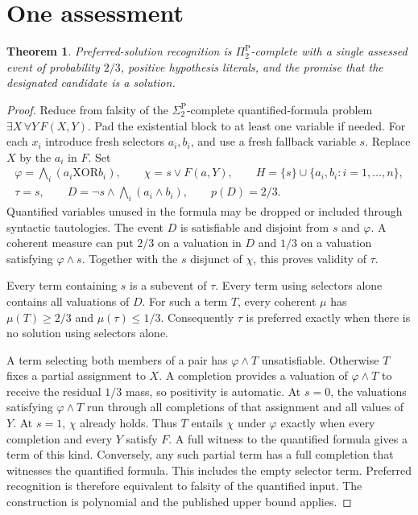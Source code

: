 \documentclass[11pt,a4paper]{amsart}
\newtheorem{theorem}{Theorem}
\begin{document}
\section{One assessment}
\begin{theorem}
Preferred-solution recognition is $\Pi_2^{\mathrm P}$-complete with a single assessed event of probability $2/3$, positive hypothesis literals, and the promise that the designated candidate is a solution.
\end{theorem}
\begin{proof}
Reduce from falsity of the $\Sigma_2^{\mathrm P}$-complete quantified-formula problem $\exists X\,\forall Y\,F(X,Y)$. Pad the existential block to at least one variable if needed. For each $x_i$ introduce fresh selectors $a_i,b_i$, and use a fresh fallback variable $s$. Replace $X$ by the $a_i$ in $F$. Set
\[
\begin{gathered}
\varphi=\bigwedge_i(a_i\mathbin{\mathrm{XOR}}b_i),\qquad
\chi=s\lor F(a,Y),\qquad H=\{s\}\cup\{a_i,b_i:i=1,\ldots,n\},\\
\tau=s,\qquad D=\neg s\land\bigwedge_i(a_i\land b_i),\qquad p(D)=2/3.
\end{gathered}
\]
Quantified variables unused in the formula may be dropped or included through syntactic tautologies. The event $D$ is satisfiable and disjoint from $s$ and $\varphi$. A coherent measure can put $2/3$ on a valuation in $D$ and $1/3$ on a valuation satisfying $\varphi\land s$. Together with the $s$ disjunct of $\chi$, this proves validity of $\tau$.

Every term containing $s$ is a subevent of $\tau$. Every term using selectors alone contains all valuations of $D$. For such a term $T$, every coherent $\mu$ has $\mu(T)\geq 2/3$ and $\mu(\tau)\leq1/3$. Consequently $\tau$ is preferred exactly when there is no solution using selectors alone.

A term selecting both members of a pair has $\varphi\land T$ unsatisfiable. Otherwise $T$ fixes a partial assignment to $X$. A completion provides a valuation of $\varphi\land T$ to receive the residual $1/3$ mass, so positivity is automatic. At $s=0$, the valuations satisfying $\varphi\land T$ run through all completions of that assignment and all values of $Y$. At $s=1$, $\chi$ already holds. Thus $T$ entails $\chi$ under $\varphi$ exactly when every completion and every $Y$ satisfy $F$. A full witness to the quantified formula gives a term of this kind. Conversely, any such partial term has a full completion that witnesses the quantified formula. This includes the empty selector term. Preferred recognition is therefore equivalent to falsity of the quantified input. The construction is polynomial and the published upper bound applies.
\end{proof}
\end{document}
